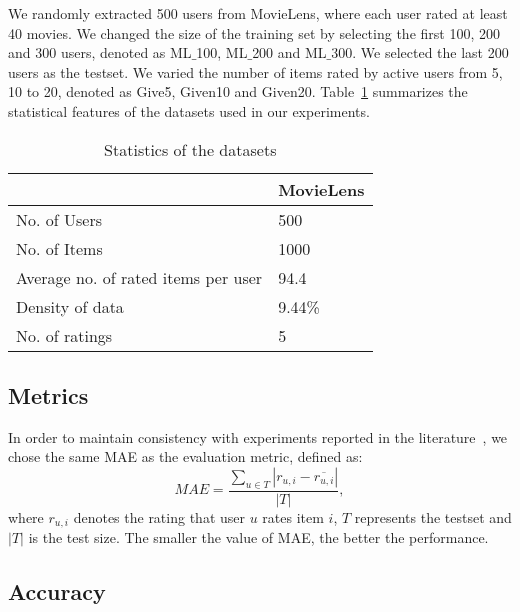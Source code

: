 We randomly extracted 500 users from MovieLens, where each user rated at least 40 movies. We changed the size of the training set by selecting the first 100, 200 and 300 users, denoted as ML$\_$100, ML$\_$200 and ML$\_$300. We selected the last 200 users as the testset. We varied the number of items rated by active users from 5, 10 to 20, denoted as Give5, Given10 and Given20. Table~\ref{tbl:dataset MovieLens} summarizes the statistical features of the datasets used in our experiments.
\begin{table}[h]
    \centering
    \caption{Statistics of the datasets}\vspace{-2ex}
    \begin{tabular}{|l|l|}
    \hline
                        &MovieLens     \\ \hline
    No. of Users     &500            \\ \hline
    No. of Items     &1000           \\ \hline
    Average no. of rated items per user   &94.4  \\ \hline
    Density of data     &9.44\%         \\ \hline
    No. of ratings      &5              \\ \hline
    \end{tabular}
    \label{tbl:dataset MovieLens}
\end{table}

\subsection{Metrics}
In order to maintain consistency with experiments reported in the literature~\cite{Xuegr:CF@2005, wangjun:CF@2006, Sarwar:WWW01@2001, Jonathan:ACM@2004, Rong:SIGIR@2004}, we chose the same MAE as the evaluation metric, defined as:
\begin{equation}\label{equ:MAE}
  MAE = \frac{\sum_{u \in T}|r_{u, i}-\overline{r_{u, i}}|}{|T|},
\end{equation}
where $r_{u, i}$ denotes the rating that user $u$ rates item $i$, $T$ represents the testset and $\left|T\right|$ is the test size. The smaller the value of MAE, the better the performance.


\subsection{Accuracy}
